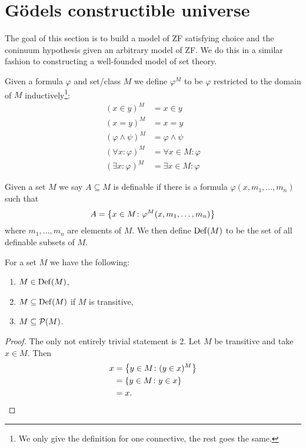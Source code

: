 \section{Gödels constructible universe}
The goal of this section is to build a model of ZF satisfying choice and the
coninuum hypothesis given an arbitrary model of ZF. We do this in a similar
fashion to constructing a well-founded model of set theory.

\begin{definition}
    Given a formula \(\varphi\) and set/class \(M\) we define \(\varphi^{M}\) to
    be \(\varphi\) restricted to the domain of \(M\) inductively\footnote{We
        only give the definition for one connective, the rest goes the same.}:
    \begin{align*}
        (x\in y)^{M}            & =x\in y                 \\
        (x=y)^{M}               & =x=y                    \\
        (\varphi\wedge\psi)^{M} & =\varphi\wedge\psi      \\
        (\forall x:\varphi)^{M} & =\forall x\in M:\varphi \\
        (\exists x:\varphi)^{M} & =\exists x\in M:\varphi
    \end{align*}
\end{definition}

\begin{definition}
    Given a set \(M\) we say \(A\subseteq M\) is definable if there is a formula
    \(\varphi(x,m_{1},\ldots,m_{n})\) such that
    \[
        A=\left\{x\in M\colon\varphi^{M}(x,m_{1},\ldots,m_{n})\right\}
    \]
    where \(m_{1},\ldots,m_{n}\) are elements of \(M\). We then define
    \(\operatorname{Def}(M)\) to be the set of all definable subsets of \(M\).
\end{definition}

\begin{proposition}
    For a set \(M\) we have the following:
    \begin{enumerate}
        \item \(M\in\operatorname{Def}(M)\),
        \item \(M\subseteq\operatorname{Def}(M)\) if \(M\) is transitive,
        \item \(M\subseteq\mathcal{P}(M)\).
    \end{enumerate}

    \begin{proof}
        The only not entirely trivial statement is 2. Let \(M\) be transitive
        and take \(x\in M\). Then
        \begin{align*}
            x & =\left\{y\in M\colon(y\in x)^{M}\right\} \\
              & =\left\{y\in M\colon y\in x\right\}       \\
              & =x.
        \end{align*}
    \end{proof}
\end{proposition}


